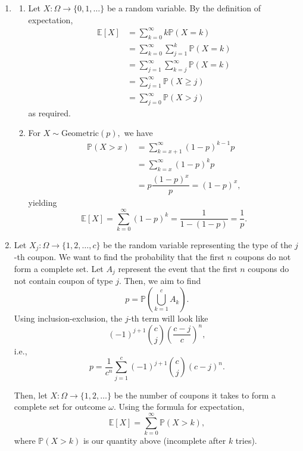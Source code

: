 \documentclass[12pt]{article}
\begin{document}
\begin{enumerate}
  \item
    \begin{enumerate}
      \item Let $X : \Omega \to \{0, 1, \ldots\}$ be a random
        variable. By the definition of expectation,
        \begin{align*}
          \mathbb E[X] &= \sum_{k = 0}^{\infty} k \mathbb P(X = k) \\
          &= \sum_{k = 0}^{\infty} \sum_{j = 1}^{k} \mathbb P(X = k) \\
          &= \sum_{j = 1}^{\infty} \sum_{k = j}^{\infty} \mathbb P(X = k) \\
          &= \sum_{j = 1}^{\infty} \mathbb P(X \geq j) \\
          &= \sum_{j = 0}^{\infty} \mathbb P(X > j)
        \end{align*}
        as required.

      \item For $X \sim \text{Geometric}(p),$ we have
        \begin{align*}
          \mathbb P(X > x) &= \sum_{k = x + 1}^{\infty} (1-p)^{k-1} p \\
          &= \sum_{k = x}^{\infty} (1-p)^{k} p \\
          &= p \dfrac{(1-p)^x}{p} = (1-p)^x,
        \end{align*}
        yielding
        $$
        \mathbb E[X] = \sum_{k = 0}^{\infty} (1-p)^k =
        \dfrac{1}{1-(1-p)} = \frac{1}{p}.
        $$
    \end{enumerate}

  \item Let $X_j: \Omega \to \{1, 2, \ldots, c\}$ be the random
    variable representing the type of the $j$-th coupon. We want to
    find the probability that the first $n$ coupons do not form a
    complete set. Let $A_j$ represent the event that the first $n$
    coupons do not contain coupon of type $j.$ Then, we aim to find
    $$
    p = \mathbb P\left(\bigcup_{k = 1}^{c} A_k\right).
    $$
    Using inclusion-exclusion, the $j$-th term will look like
    $$
    (-1)^{j + 1}{c \choose j} \left(\dfrac{c - j}{c}\right)^{n},
    $$
    i.e.,
    $$
    p = \dfrac{1}{c^n}\sum_{j = 1}^{c} (-1)^{j + 1} { c \choose j} (c-j)^n.
    $$

    Then, let $X : \Omega \to \{1, 2, \ldots\}$ be the number of
    coupons it takes to form a complete set for outcome $\omega.$
    Using the formula for expectation,
    $$
    \mathbb E[X] = \sum_{k = 0}^{\infty} \mathbb P(X > k),
    $$
    where $\mathbb P(X > k)$ is our quantity above (incomplete after $k$ tries).


\end{enumerate}
\end{document}
